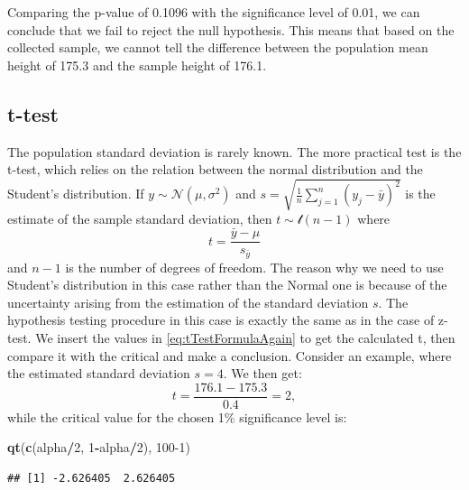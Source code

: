 \documentclass[
]{book}
\newenvironment{Shaded}{\begin{snugshade}}{\end{snugshade}}
\newcommand{\DecValTok}[1]{\textcolor[rgb]{0.00,0.00,0.81}{#1}}
\newcommand{\KeywordTok}[1]{\textcolor[rgb]{0.13,0.29,0.53}{\textbf{#1}}}
\newcommand{\NormalTok}[1]{#1}
\newcommand{\OperatorTok}[1]{\textcolor[rgb]{0.81,0.36,0.00}{\textbf{#1}}}
\theoremstyle{definition}
\theoremstyle{definition}
\theoremstyle{definition}
\theoremstyle{definition}
\theoremstyle{remark}
\begin{document}
Comparing the p-value of 0.1096 with the significance level of 0.01, we can conclude that we fail to reject the null hypothesis. This means that based on the collected sample, we cannot tell the difference between the population mean height of 175.3 and the sample height of 176.1.

\hypertarget{statisticalTestsOneSampleMeanT}{%
\subsection{t-test}\label{statisticalTestsOneSampleMeanT}}

The population standard deviation is rarely known. The more practical test is the t-test, which relies on the relation between the normal distribution and the Student's distribution. If \(y \sim \mathcal{N}(\mu ,\sigma^2)\) and \(s=\sqrt{\frac{1}{n}\sum_{j=1}^n{\left(y_j-\bar{y}\right)^2}}\) is the estimate of the sample standard deviation, then \(t \sim \mathcal{t}(n-1)\) where
\begin{equation}
    t = \frac{\bar{y}-\mu}{s_{\bar{y}}} 
    \label{eq:tTestFormulaAgain}
\end{equation}
and \(n-1\) is the number of degrees of freedom. The reason why we need to use Student's distribution in this case rather than the Normal one is because of the uncertainty arising from the estimation of the standard deviation \(s\). The hypothesis testing procedure in this case is exactly the same as in the case of z-test. We insert the values in \eqref{eq:tTestFormulaAgain} to get the calculated t, then compare it with the critical and make a conclusion. Consider an example, where the estimated standard deviation \(s=4\). We then get:
\begin{equation*}
    t = \frac{176.1-175.3}{0.4} = 2 ,
\end{equation*}
while the critical value for the chosen 1\% significance level is:

\begin{Shaded}
\begin{Highlighting}[]
\KeywordTok{qt}\NormalTok{(}\KeywordTok{c}\NormalTok{(alpha}\OperatorTok{/}\DecValTok{2}\NormalTok{, }\DecValTok{1}\OperatorTok{{-}}\NormalTok{alpha}\OperatorTok{/}\DecValTok{2}\NormalTok{), }\DecValTok{100{-}1}\NormalTok{)}
\end{Highlighting}
\end{Shaded}

\begin{verbatim}
## [1] -2.626405  2.626405
\end{verbatim}
\end{document}
